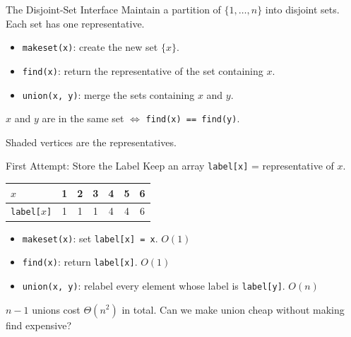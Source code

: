 \documentclass[10pt,aspectratio=169]{beamer}
\begin{document}
\begin{frame}{The Disjoint-Set Interface}
  Maintain a partition of $\{1, \ldots, n\}$ into disjoint sets. Each set has
  one \alert{representative}.

  \medskip
  \begin{itemize}
    \item \texttt{makeset(x)}: create the new set $\{x\}$.
    \item \texttt{find(x)}: return the representative of the set containing
          $x$.
    \item \texttt{union(x, y)}: merge the sets containing $x$ and $y$.
  \end{itemize}

  \medskip
  $x$ and $y$ are in the same set $\iff$ \texttt{find(x) == find(y)}.

  \bigskip
  \begin{center}
  \end{center}

  \begin{center}
  \small Shaded vertices are the representatives.
  \end{center}
\end{frame}

\begin{frame}{First Attempt: Store the Label}
  Keep an array \texttt{label[x]} = representative of $x$.

  \bigskip
  \begin{center}
  \begin{tabular}{l|cccccc}
    $x$ & 1 & 2 & 3 & 4 & 5 & 6 \\ \hline
    \texttt{label[$x$]} & 1 & 1 & 1 & 4 & 4 & 6 \\
  \end{tabular}
  \end{center}

  \bigskip
  \begin{itemize}
    \item \texttt{makeset(x)}: set \texttt{label[x] = x}. \hfill $O(1)$
    \item \texttt{find(x)}: return \texttt{label[x]}. \hfill $O(1)$
    \item \texttt{union(x, y)}: relabel every element whose label is
          \texttt{label[y]}. \hfill \alert{$O(n)$}
  \end{itemize}

  \pause
  \bigskip
  $n - 1$ unions cost $\Theta(n^2)$ in total. Can we make union cheap without
  making find expensive?
\end{frame}
\end{document}
